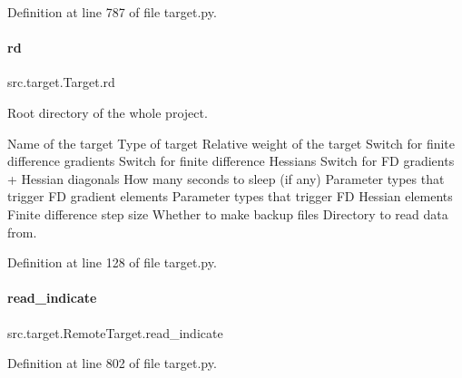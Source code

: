 Definition at line 787 of file target.\+py.

\mbox{\label{classsrc_1_1target_1_1Target_af85bc6ed8a95bc598f2e72a7213b972e}} 
\paragraph{\texorpdfstring{rd}{rd}}
{\footnotesize\ttfamily src.\+target.\+Target.\+rd\hspace{0.3cm}{\ttfamily [inherited]}}



Root directory of the whole project. 

Name of the target Type of target Relative weight of the target Switch for finite difference gradients Switch for finite difference Hessians Switch for FD gradients + Hessian diagonals How many seconds to sleep (if any) Parameter types that trigger FD gradient elements Parameter types that trigger FD Hessian elements Finite difference step size Whether to make backup files Directory to read data from. 

Definition at line 128 of file target.\+py.

\mbox{\label{classsrc_1_1target_1_1RemoteTarget_aafe08c71569bff42587c214d9ab973cc}} 
\paragraph{\texorpdfstring{read\+\_\+indicate}{read\_indicate}}
{\footnotesize\ttfamily src.\+target.\+Remote\+Target.\+read\+\_\+indicate}



Definition at line 802 of file target.\+py.

\mbox{\label{classsrc_1_1target_1_1Target_a0d3f766725247a90dc1b4ab8ec89e1c9}} 
